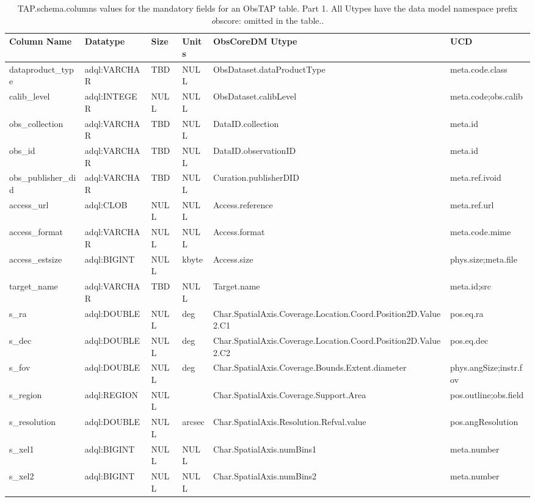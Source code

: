 \documentclass[11pt,a4paper]{ivoa}
\begin{document}
\begin{table}
\small
\begin{tabular}{|l|l|l|l|l|l|}%
\hline
Column Name & Datatype & Size & Units & ObsCoreDM Utype & UCD \\\hline
dataproduct\_type &
adql:VARCHAR &
TBD &
NULL &
ObsDataset.dataProductType &
meta.code.class
\\\hline
calib\_level &
adql:INTEGER &
NULL &
NULL &
ObsDataset.calibLevel &
meta.code;obs.calib
\\\hline
obs\_collection &
adql:VARCHAR &
TBD &
NULL &
DataID.collection &
meta.id
\\\hline
obs\_id &
adql:VARCHAR &
TBD &
NULL &
DataID.observationID &
meta.id
\\\hline
obs\_publisher\_did &
adql:VARCHAR &
TBD &
NULL &
Curation.publisherDID &
meta.ref.ivoid
\\\hline
access\_url &
adql:CLOB &
NULL &
NULL &
Access.reference &
meta.ref.url
\\\hline
access\_format &
adql:VARCHAR &
NULL &
NULL &
Access.format &
meta.code.mime
\\\hline
access\_estsize &
adql:BIGINT &
NULL &
kbyte &
Access.size &
phys.size;meta.file
\\\hline
target\_name &
adql:VARCHAR &
TBD &
NULL &
Target.name &
meta.id;src
\\\hline
s\_ra &
adql:DOUBLE &
NULL &
deg &
Char.SpatialAxis.Coverage.Location.Coord.Position2D.Value2.C1 &
pos.eq.ra
\\\hline
s\_dec &
adql:DOUBLE &
NULL &
deg &
Char.SpatialAxis.Coverage.Location.Coord.Position2D.Value2.C2 &
pos.eq.dec
\\\hline
s\_fov &
adql:DOUBLE &
NULL &
deg &
Char.SpatialAxis.Coverage.Bounds.Extent.diameter &
phys.angSize;instr.fov
\\\hline
s\_region &
adql:REGION &
NULL &
 &
Char.SpatialAxis.Coverage.Support.Area &
pos.outline;obs.field
\\\hline
s\_resolution &
adql:DOUBLE &
NULL &
arcsec &
Char.SpatialAxis.Resolution.Refval.value &
pos.angResolution
\\\hline
s\_xel1 &
adql:BIGINT &
NULL &
NULL &
Char.SpatialAxis.numBins1 &
meta.number
\\\hline
s\_xel2 &
adql:BIGINT &
NULL &
NULL &
Char.SpatialAxis.numBins2 &
meta.number
\\\hline
\end{tabular}
\caption{TAP.schema.columns values for the mandatory fields for an ObsTAP table. Part 1. All Utypes have the data model namespace prefix {\emph obscore:} omitted in the table..}
\label{table:tapschema-mandatory1}
\end{table}
\end{document}

